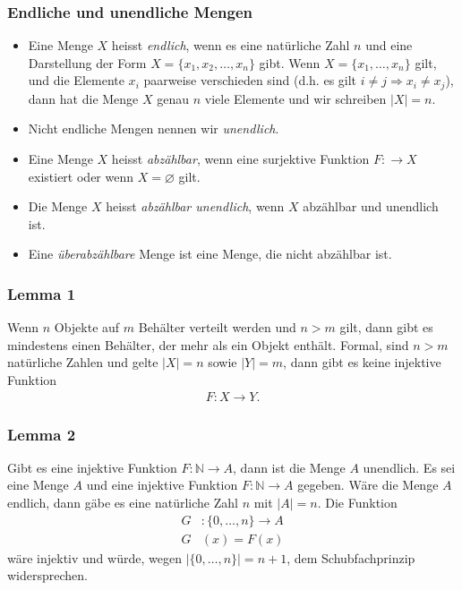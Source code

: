 \subsubsection{Endliche und unendliche Mengen}%
\label{ssub:endliche_und_unendliche_mengen}
\begin{itemize}
\item Eine Menge $X$ heisst \textit{endlich}, wenn es eine natürliche Zahl $n$ und eine Darstellung der Form $X=\{x_1,x_2,\dots,x_n\}$ gibt. Wenn $X=\{x_1,\dots,x_n\}$ gilt, und die Elemente $x_i$ paarweise verschieden sind (d.h. es gilt $i\neq j\Rightarrow x_i\neq x_j$), dann hat die Menge $X$ genau $n$ viele Elemente und wir schreiben $|X|=n$.
\item Nicht endliche Mengen nennen wir \textit{unendlich}.
\item Eine Menge $X$ heisst \textit{abzählbar}, wenn eine surjektive Funktion $F:\to X$ existiert oder wenn $X=\varnothing$ gilt.
\item Die Menge $X$ heisst \textit{abzählbar unendlich}, wenn $X$ abzählbar und unendlich ist.
\item Eine \textit{überabzählbare} Menge ist eine Menge, die nicht abzählbar ist.
\end{itemize}

\begin{minipage}{0.9\linewidth}
\subsubsection{Lemma 1}%
\label{ssub:lemma_1}
Wenn $n$ Objekte auf $m$ Behälter verteilt werden und $n>m$ gilt, dann gibt es mindestens einen Behälter, der mehr als ein Objekt enthält. Formal, sind $n>m$ natürliche Zahlen und gelte $|X|= n$ sowie $|Y|=m$, dann gibt es keine injektive Funktion
\begin{align*}
 F: X\to Y.
\end{align*}
\end{minipage}

\begin{minipage}{0.9\linewidth}
\subsubsection{Lemma 2}%
\label{ssub:lemma_2}
Gibt es eine injektive Funktion $F:\mathbb{N}\to A$, dann ist die Menge $A$ unendlich.
    Es sei eine Menge $A$ und eine injektive Funktion $F:\mathbb{N}\to A$ gegeben. Wäre die Menge $A$ endlich, dann gäbe es eine natürliche Zahl $n$ mit $|A|=n$. Die Funktion
    \begin{align*}
    G&:\{0,\dots,n\}\to A\\
    G&(x) = F(x)
    \end{align*}
    wäre injektiv und würde, wegen $|\{0,\dots,n\}|=n+1$, dem Schubfachprinzip widersprechen.
\end{minipage}

